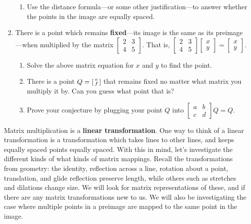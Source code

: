 \documentclass[../gatm.tex]{subfiles}
\begin{document}
\begin{enumerate}
\begin{enumerate}
\item Use the distance formula---or some other justification---to answer whether the points in the image are equally spaced.
\end{enumerate}
\item There is a point which remains \textbf{fixed}---its image is the same as its preimage---when multiplied by the matrix $\left[\begin{array}{cc}2 & 3 \\ 4 & 5 \end{array}\right]$. That is, $\left[\begin{array}{cc}2 & 3 \\ 4 & 5 \end{array}\right]\left[\begin{array}{c} x \\ y \end{array}\right]=\left[\begin{array}{c} x \\ y \end{array}\right]$.
\begin{enumerate}
\item Solve the above matrix equation for $x$ and $y$ to find the point.
\item There is a point $Q=\begin{bsmallmatrix}e \\ f \end{bsmallmatrix}$ that remains fixed no matter what matrix you multiply it by. Can you guess what point that is?
\item Prove your conjecture by plugging your point $Q$ into $\left[\begin{array}{cc}a & b \\ c & d\end{array}\right]Q=Q$.
\end{enumerate}
\setcounter{mp_problem_i}{\value{enumi}}
\end{enumerate}

Matrix multiplication is a \textbf{linear transformation}. One way to think of a linear transformation is a transformation which takes lines to other lines, and keeps equally spaced points equally spaced. With this in mind, let's investigate the different kinds of what kinds of matrix mappings. Recall the transformations from geometry: the identity, reflection across a line, rotation about a point, translation, and glide reflection preserve length, while others such as stretches and dilations change size. We will look for matrix representations of these, and if there are any matrix transformations new to us. We will also be investigating the case where multiple points in a preimage are mapped to the same point in the image.
\end{document}
